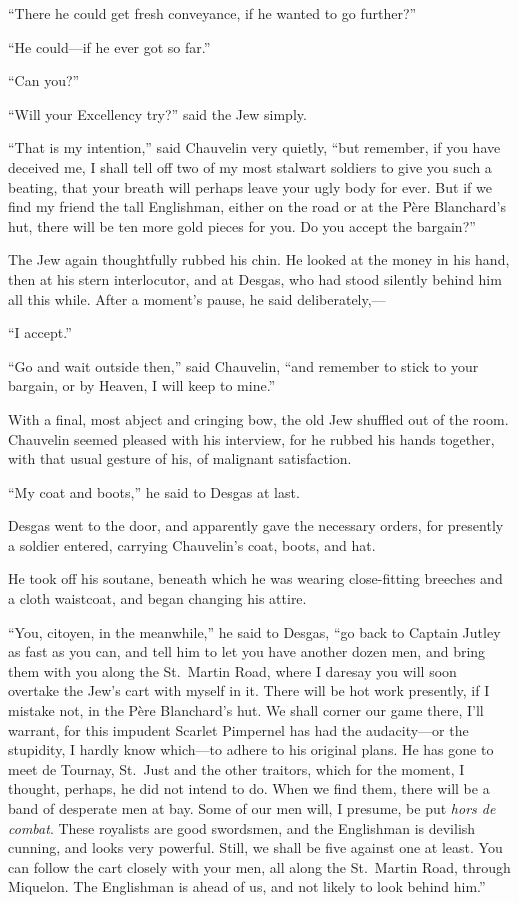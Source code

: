 \documentclass[paper=5.5in:8.5in,BCOR=7mm,twoside,DIV=calc,12pt,usegeometry,chapterprefix,endperiod,headings=big]{scrbook}
\begin{document}
\enquote{There he could get fresh conveyance, if he wanted to go further?}

\enquote{He could---if he ever got so far.}

\enquote{Can you?}

\enquote{Will your Excellency try?} said the Jew simply.

\enquote{That is my intention,} said Chauvelin very quietly, \enquote{but remember, if you have deceived me, I shall tell off two of my most stalwart soldiers to give you such a beating, that your breath will perhaps leave your ugly body for ever. But if we find my friend the tall Englishman, either on the road or at the Père Blanchard's hut, there will be ten more gold pieces for you. Do you accept the bargain?}

The Jew again thoughtfully rubbed his chin. He looked at the money in his hand, then at his stern interlocutor, and at Desgas, who had stood silently behind him all this while. After a moment's pause, he said deliberately,---

\enquote{I accept.}

\enquote{Go and wait outside then,} said Chauvelin, \enquote{and remember to stick to your bargain, or by Heaven, I will keep to mine.}

With a final, most abject and cringing bow, the old Jew shuffled out of the room. Chauvelin seemed pleased with his interview, for he rubbed his hands together, with that usual gesture of his, of malignant satisfaction.

\enquote{My coat and boots,} he said to Desgas at last.

Desgas went to the door, and apparently gave the necessary orders, for presently a soldier entered, carrying Chauvelin's coat, boots, and hat.

He took off his soutane, beneath which he was wearing close-fitting breeches and a cloth waistcoat, and began changing his attire.

\enquote{You, citoyen, in the meanwhile,} he said to Desgas, \enquote{go back to Captain Jutley as fast as you can, and tell him to let you have another dozen men, and bring them with you along the St.~Martin Road, where I daresay you will soon overtake the Jew's cart with myself in it. There will be hot work presently, if I mistake not, in the Père Blanchard's hut. We shall corner our game there, I'll warrant, for this impudent Scarlet Pimpernel has had the audacity---or the stupidity, I hardly know which---to adhere to his original plans. He has gone to meet de Tournay, St.~Just and the other traitors, which for the moment, I thought, perhaps, he did not intend to do. When we find them, there will be a band of desperate men at bay. Some of our men will, I presume, be put \textit{hors de combat}. These royalists are good swordsmen, and the Englishman is devilish cunning, and looks very powerful. Still, we shall be five against one at least. You can follow the cart closely with your men, all along the St.~Martin Road, through Miquelon. The Englishman is ahead of us, and not likely to look behind him.}
\end{document}

